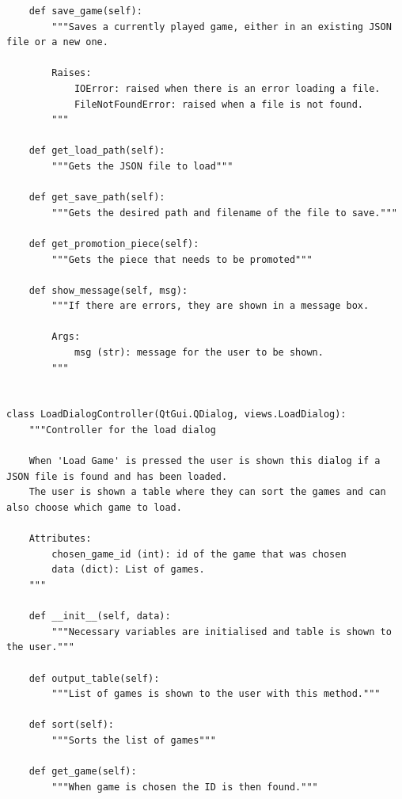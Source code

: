 \documentclass[twoside, 12pt]{report}
\begin{document}
\begin{verbatim}
 	def save_game(self):
		"""Saves a currently played game, either in an existing JSON file or a new one.
	
		Raises:
			IOError: raised when there is an error loading a file.
			FileNotFoundError: raised when a file is not found.
		"""
		
	def get_load_path(self):
		"""Gets the JSON file to load"""
		
	def get_save_path(self):
		"""Gets the desired path and filename of the file to save."""
	
 	def get_promotion_piece(self):
		"""Gets the piece that needs to be promoted"""
	
 	def show_message(self, msg):
		"""If there are errors, they are shown in a message box.
	
		Args:
			msg (str): message for the user to be shown.
		"""
		

class LoadDialogController(QtGui.QDialog, views.LoadDialog):
	"""Controller for the load dialog

	When 'Load Game' is pressed the user is shown this dialog if a JSON file is found and has been loaded.
	The user is shown a table where they can sort the games and can also choose which game to load.

	Attributes:
		chosen_game_id (int): id of the game that was chosen
		data (dict): List of games.
	"""
	
 	def __init__(self, data):
		"""Necessary variables are initialised and table is shown to the user."""
	
 	def output_table(self):
		"""List of games is shown to the user with this method."""
	
 	def sort(self):
		"""Sorts the list of games"""
	
 	def get_game(self):
		"""When game is chosen the ID is then found."""
\end{verbatim}
\end{document}
